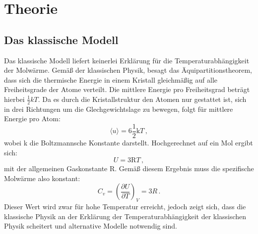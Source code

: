 \section{Theorie}
\subsection{Das klassische Modell}
Das klassische Modell liefert keinerlei Erklärung für die Temperaturabhängigkeit der Molwärme. Gemäß der klassischen Physik, besagt das Äquipartitionstheorem, dass
sich die thermische Energie in einem Kristall gleichmäßig auf alle Freiheitsgrade der Atome verteilt. Die mittlere Energie pro Freiheitsgrad beträgt hierbei $\frac{1}{2}kT$. Da
es durch die Kristallstruktur den Atomen nur gestattet ist, sich in drei Richtungen um die Glechgewichtslage zu bewegen, folgt für mittlere Energie pro Atom:
\begin{equation}
  \langle u \rangle = 6 \frac{1}{2}\text{k}T\, ,
\end{equation}
wobei k die Boltzmannsche Konstante darstellt. Hochgerechnet auf ein Mol ergibt sich:
\begin{equation}
  U = 3 \text{R}T \, ,
\end{equation}
mit der allgemeinen Gaskonstante R. Gemäß diesem Ergebnis muss die spezifische Molwärme also konstant:
\begin{equation}
  C_v= \left(\frac{\partial U}{\partial T}\right)_V=3R\, .
\end{equation}
Dieser Wert wird zwar für hohe Temperatur erreicht, jedoch zeigt sich, dass die klassische Physik an der Erklärung der Temperaturabhängigkeit der klassischen Physik scheitert
und alternative Modelle notwendig sind.
